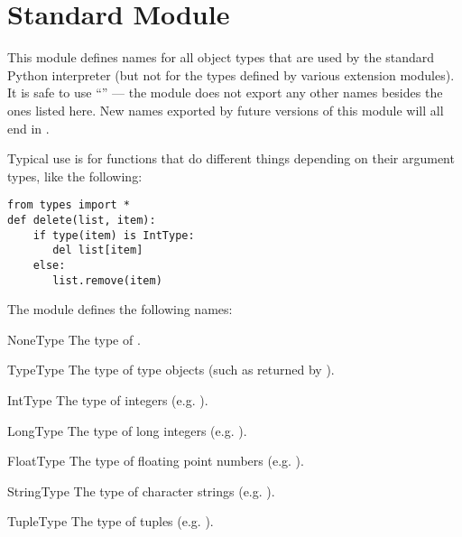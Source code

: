 \section{Standard Module }
\label{module-types}


This module defines names for all object types that are used by the
standard Python interpreter (but not for the types defined by various
extension modules).  It is safe to use ``'' ---
the module does not export any other names besides the ones listed
here.  New names exported by future versions of this module will
all end in .

Typical use is for functions that do different things depending on
their argument types, like the following:

\begin{verbatim}
from types import *
def delete(list, item):
    if type(item) is IntType:
       del list[item]
    else:
       list.remove(item)
\end{verbatim}
%
The module defines the following names:

\begin{datadesc}{NoneType}
The type of .
\end{datadesc}

\begin{datadesc}{TypeType}
The type of type objects (such as returned by ).
\end{datadesc}

\begin{datadesc}{IntType}
The type of integers (e.g. ).
\end{datadesc}

\begin{datadesc}{LongType}
The type of long integers (e.g. ).
\end{datadesc}

\begin{datadesc}{FloatType}
The type of floating point numbers (e.g. ).
\end{datadesc}

\begin{datadesc}{StringType}
The type of character strings (e.g. ).
\end{datadesc}

\begin{datadesc}{TupleType}
The type of tuples (e.g. ).
\end{datadesc}

